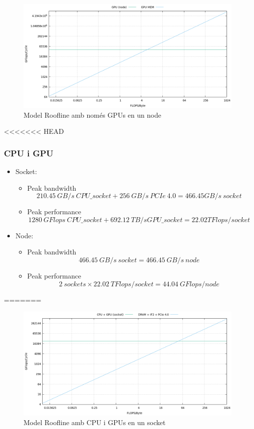 \begin{figure}[H]
    \centering
    \includegraphics[width=\textwidth]{entregable/img/roofline_gpun_memgpu}
    \caption{Model Roofline amb només GPUs en un node}
    \label{fig:summary}
\end{figure}

<<<<<<< HEAD
\subsubsection{CPU i GPU}
\begin{itemize}
    \item Socket:
        \begin{itemize}
            \item Peak bandwidth
                \[210.45\ GB/s\ CPU\_socket + 256\ GB/s\ PCIe\ 4.0 = 466.45 GB/s\ socket\]
            \item Peak performance
                \[ 1280\ GFlops\ CPU\_socket + 692.12\ TB/s GPU\_socket = 22.02 TFlops/socket\]
        \end{itemize}
    \item Node:
        \begin{itemize}
            \item Peak bandwidth
                \[466.45\ GB/s\ socket = 466.45\ GB/s\ node\]
            \item Peak performance
\[2\ sockets \times 22.02\ TFlops/socket = 44.04\ GFlops/node\]
        \end{itemize}
\end{itemize}

=======
\begin{figure}[H]
    \centering
    \includegraphics[width=\textwidth]{entregable/img/roofline_cpu_gpus}
    \caption{Model Roofline amb CPU i GPUs en un socket}
    \label{fig:summary}
\end{figure}

